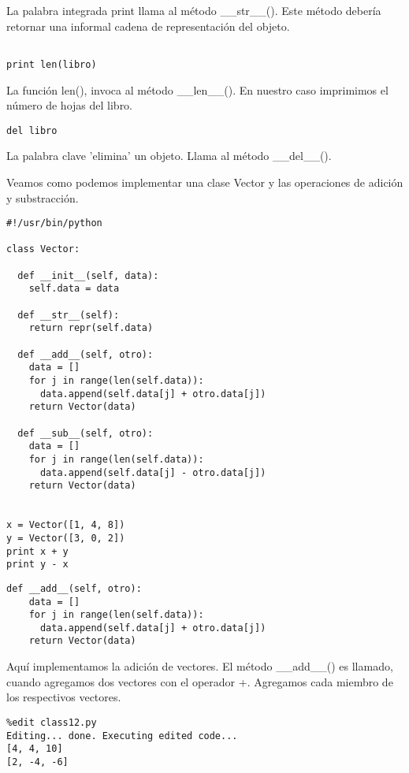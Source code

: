 \documentclass[twoside,10.5pt]{article}%
\begin{document}
La palabra integrada print llama al m\'etodo {\color{blue}\_\_str\_\_()}. Este m\'etodo deber\'ia retornar una informal cadena de representaci\'on del objeto.

\begin{verbatim}

print len(libro)
\end{verbatim}

La funci\'on len(), invoca al m\'etodo {\color{blue}\_\_len\_\_()}. En nuestro caso imprimimos el n\'umero de hojas del libro.


\begin{verbatim}
del libro
\end{verbatim}

La palabra clave 'elimina' un objeto. Llama al m\'etodo {\color{blue}\_\_del\_\_()}.


\vspace{0.3cm}


Veamos como podemos implementar una clase Vector y las operaciones de adici\'on y substracci\'on.


\begin{verbatim}
#!/usr/bin/python

class Vector:

  def __init__(self, data):
    self.data = data

  def __str__(self):
    return repr(self.data)

  def __add__(self, otro):
    data = []
    for j in range(len(self.data)):
      data.append(self.data[j] + otro.data[j])
    return Vector(data)

  def __sub__(self, otro):
    data = []
    for j in range(len(self.data)):
      data.append(self.data[j] - otro.data[j])
    return Vector(data)


x = Vector([1, 4, 8])
y = Vector([3, 0, 2])
print x + y
print y - x
\end{verbatim}


\vspace{0.3cm}


\begin{verbatim}
def __add__(self, otro):
    data = []
    for j in range(len(self.data)):
      data.append(self.data[j] + otro.data[j])
    return Vector(data)
\end{verbatim}

Aqu\'i implementamos la adici\'on de vectores. El m\'etodo {\color{blue}\_\_add\_\_()} es llamado, cuando agregamos dos vectores con el operador +. Agregamos cada miembro de los respectivos vectores.


\begin{verbatim}
%edit class12.py
Editing... done. Executing edited code...
[4, 4, 10]
[2, -4, -6]
\end{verbatim}
\end{document}
